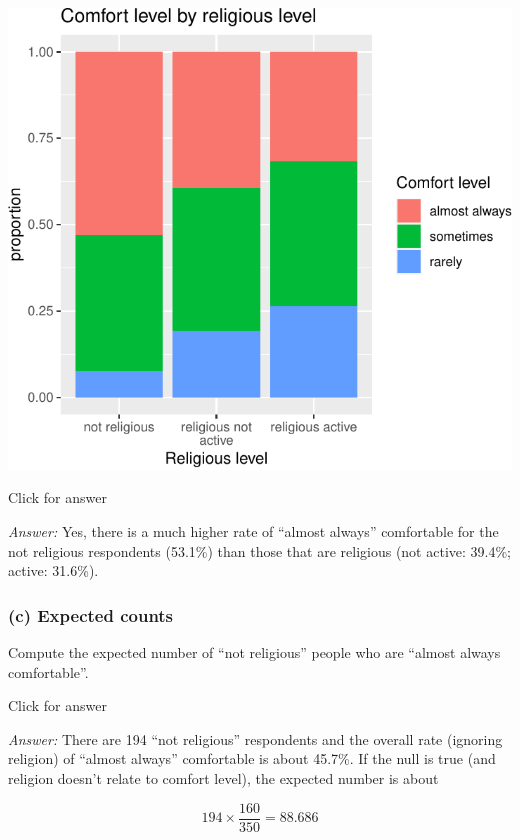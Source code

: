 \documentclass[
]{book}
\newenvironment{Shaded}{\begin{snugshade}}{\end{snugshade}}
\newcommand{\FunctionTok}[1]{\textcolor[rgb]{0.00,0.00,0.00}{#1}}
\newcommand{\NormalTok}[1]{#1}
\newcommand{\SpecialCharTok}[1]{\textcolor[rgb]{0.00,0.00,0.00}{#1}}
\begin{document}
\begin{center}\includegraphics[width=1\linewidth]{Class_Activity_21_files/figure-latex/unnamed-chunk-3-1} \end{center}

Click for answer

\emph{Answer:} Yes, there is a much higher rate of ``almost always'' comfortable for the not religious respondents (53.1\%) than those that are religious (not active: 39.4\%; active: 31.6\%).

\hypertarget{c-expected-counts}{%
\subsubsection{(c) Expected counts}\label{c-expected-counts}}

Compute the expected number of ``not religious'' people who are ``almost always comfortable''.

Click for answer

\emph{Answer:} There are 194 ``not religious'' respondents and the overall rate (ignoring religion) of ``almost always'' comfortable is about 45.7\%. If the null is true (and religion doesn't relate to comfort level), the expected number is about

\[194 \times \dfrac{160}{350} = 88.686\]

\begin{Shaded}
\end{Shaded}
\end{document}
